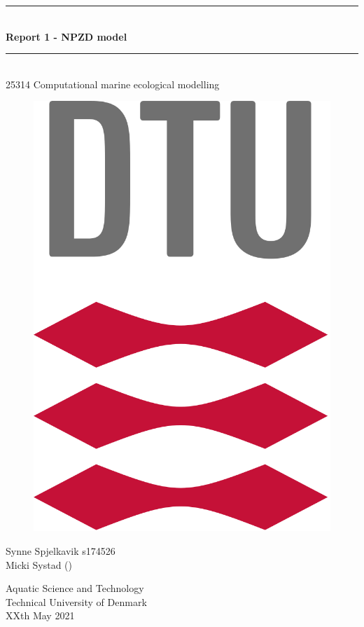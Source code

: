\begin{titlepage}
\centering \parindent=0pt
\newcommand{\HRule}{\rule{\textwidth}{0.1mm}}
 \HRule\\[0.1cm]\huge\bfseries
Report 1 - NPZD model
\HRule\\[0.5cm]

\Large 25314 Computational marine ecological modelling \\[2.5cm]
\begin{figure}[H]
  \centering
    \includegraphics[scale=0.20]{Figures/uni-logo.png}
    \label{fig:forside}
\end{figure}
\vspace*{\fill}
Synne Spjelkavik s174526\\
Micki Systad ()\\
\vspace*{\fill}

\begin{flushleft}
\normalsize
Aquatic Science and Technology\\
Technical University of Denmark\\
XXth May 2021\\
\end{flushleft}
\end{titlepage}